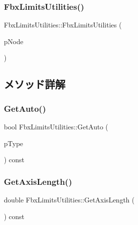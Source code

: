 \subsubsection{\texorpdfstring{Fbx\+Limits\+Utilities()}{FbxLimitsUtilities()}}
{\footnotesize\ttfamily Fbx\+Limits\+Utilities\+::\+Fbx\+Limits\+Utilities (\begin{DoxyParamCaption}\item[{\hyperlink{class_fbx_node}{Fbx\+Node} $\ast$}]{p\+Node }\end{DoxyParamCaption})}



\subsection{メソッド詳解}
\mbox{\label{class_fbx_limits_utilities_a299f897153503e07a28b512fb05ed408}} 
\subsubsection{\texorpdfstring{Get\+Auto()}{GetAuto()}}
{\footnotesize\ttfamily bool Fbx\+Limits\+Utilities\+::\+Get\+Auto (\begin{DoxyParamCaption}\item[{\hyperlink{class_fbx_limits_utilities_aa55167751039b3d64b56cb7e58f2e62c}{E\+Type}}]{p\+Type }\end{DoxyParamCaption}) const}

\mbox{\label{class_fbx_limits_utilities_afa51661729568ef9c39b84c79b6b6ef0}} 
\subsubsection{\texorpdfstring{Get\+Axis\+Length()}{GetAxisLength()}}
{\footnotesize\ttfamily double Fbx\+Limits\+Utilities\+::\+Get\+Axis\+Length (\begin{DoxyParamCaption}{ }\end{DoxyParamCaption}) const}

\mbox{\label{class_fbx_limits_utilities_abe24c72b27fe512b2e1ea982b804d423}} 
